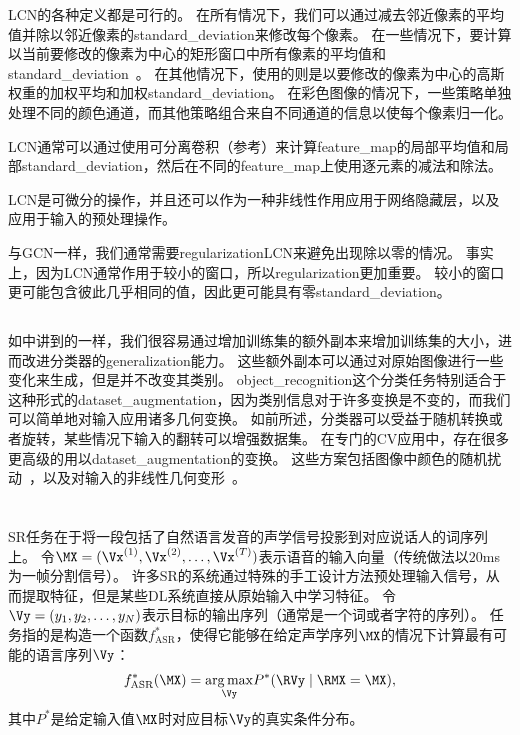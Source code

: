 \gls{LCN}的各种定义都是可行的。
在所有情况下，我们可以通过减去邻近像素的平均值并除以邻近像素的\gls{standard_deviation}来修改每个像素。
在一些情况下，要计算以当前要修改的像素为中心的矩形窗口中所有像素的平均值和\gls{standard_deviation}~\citep{Pinto08}。
在其他情况下，使用的则是以要修改的像素为中心的高斯权重的加权平均和加权\gls{standard_deviation}。
在彩色图像的情况下，一些策略单独处理不同的颜色通道，而其他策略组合来自不同通道的信息以使每个像素归一化\citep{sermanet-icpr-12}。

\gls{LCN}通常可以通过使用可分离卷积（参考）来计算\gls{feature_map}的局部平均值和局部\gls{standard_deviation}，然后在不同的\gls{feature_map}上使用逐元素的减法和除法。

\gls{LCN}是可微分的操作，并且还可以作为一种非线性作用应用于网络隐藏层，以及应用于输入的预处理操作。

与\gls{GCN}一样，我们通常需要\gls{regularization}\gls{LCN}来避免出现除以零的情况。
事实上，因为\gls{LCN}通常作用于较小的窗口，所以\gls{regularization}更加重要。
较小的窗口更可能包含彼此几乎相同的值，因此更可能具有零\gls{standard_deviation}。


\subsection{}
\label{sec:dataset_augmentation_chap12}
如中讲到的一样，我们很容易通过增加训练集的额外副本来增加训练集的大小，进而改进分类器的\gls{generalization}能力。
这些额外副本可以通过对原始图像进行一些变化来生成，但是并不改变其类别。
\gls{object_recognition}这个分类任务特别适合于这种形式的\gls{dataset_augmentation}，因为类别信息对于许多变换是不变的，而我们可以简单地对输入应用诸多几何变换。
如前所述，分类器可以受益于随机转换或者旋转，某些情况下输入的翻转可以增强数据集。
在专门的\gls{CV}应用中，存在很多更高级的用以\gls{dataset_augmentation}的变换。
这些方案包括图像中颜色的随机扰动~\citep{Krizhevsky-2012}，以及对输入的非线性几何变形~\citep{LeCun98-small}。




\section{}
\label{sec:speech_recognition}

\gls{SR}任务在于将一段包括了自然语言发音的声学信号投影到对应说话人的词序列上。
令$\MX=(\Vx^{(1)},\Vx^{(2)},\ldots,\Vx^{(T)})$表示语音的输入向量（传统做法以$20$ms为一帧分割信号）。
许多\gls{SR}的系统通过特殊的手工设计方法预处理输入信号，从而提取特征，但是某些\gls{DL}系统\citep{jaitly2011learning}直接从原始输入中学习特征。
令$\Vy=(y_{1},y_{2},\ldots,y_{N})$表示目标的输出序列（通常是一个词或者字符的序列）。
任务指的是构造一个函数$f^*_{\text{ASR}}$，使得它能够在给定声学序列$\MX$的情况下计算最有可能的语言序列$\Vy$：
\begin{align}
\label{eqn:124}
f^*_{\text{ASR}}(\MX) =  \underset{\Vy}{\arg\max}  P^*(\RVy \mid \RMX = \MX),
\end{align}
其中$P^*$是给定输入值$\MX$时对应目标$\Vy$的真实条件分布。

